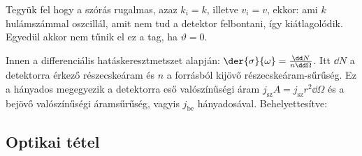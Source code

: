    Tegyük fel hogy a szórás rugalmas, azaz $k_i=k$, illetve $v_i=v$, ekkor:
   ami $k$ hulámszámmal oszcillál, amit nem tud a detektor felbontani, így kiátlagolódik.
   Egyedül akkor nem tűnik el ez a tag, ha $\vartheta=0$.
   
   Innen a differenciális hatáskeresztmetszet  alapján: $\der{\sigma}{\omega}=\frac{\dd N}{n\dd\Omega}$.
   Itt $\dd N$ a detektorra érkező részecskeáram és $n$ a forrásból kijövő részecskeáram-sűrűség.
   Ez a hányados megegyezik a detektorra eső valószínűségi áram $j_\text{sz}A=j_\text{sz}r^2\dd\Omega$ és a bejövő valószínűségi áramsűrűség, vagyis $j_\text{be}$ hányadosával.
   Behelyettesítve:
   
  \subsection{Optikai tétel}
   
